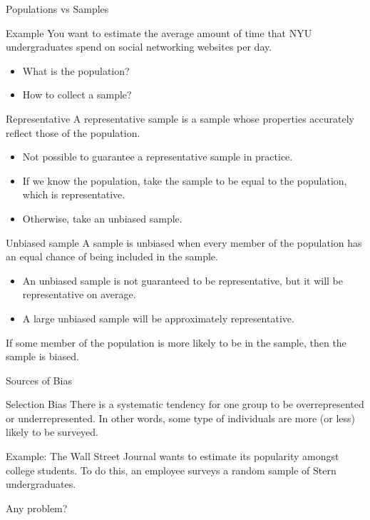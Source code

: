 \documentclass{beamer}
\begin{document}
\begin{frame}{Populations vs Samples}
\begin{block}{Example}
You want to estimate the average amount of time that NYU undergraduates spend on social networking websites per day. %
\end{block}
\begin{itemize}
\item What is the population?
\item How to collect a sample?
\end{itemize}
\end{frame}


\begin{frame}{Representative}
A representative sample is a sample whose properties accurately reflect those of the population. 
\begin{itemize}
\item Not possible to guarantee a representative sample in practice.
\item If we know the population, take the sample to be equal to the population, which is representative.
\item Otherwise, take an \alert{unbiased} sample.
\end{itemize}
\end{frame}


\begin{frame}{Unbiased sample}
A sample is unbiased when every member of the population has an equal chance of being included in the sample.
\begin{itemize}
\item An unbiased sample is  not guaranteed to be representative, but  it will be representative on average.
\item A large unbiased sample will be approximately representative. 
\end{itemize}

If some member of the population is more likely to be in the sample, then the sample is biased. 

\end{frame}


\begin{frame}{Sources of Bias}
\begin{block}{Selection Bias}
There is a systematic tendency for one group to be overrepresented or underrepresented. In other words, some type of individuals are more (or less) likely to be surveyed. 
\end{block}

Example: The Wall Street Journal wants to estimate its popularity amongst college students.  To do this, an employee surveys a random sample of Stern undergraduates.

Any problem?
\end{frame}
\end{document}
